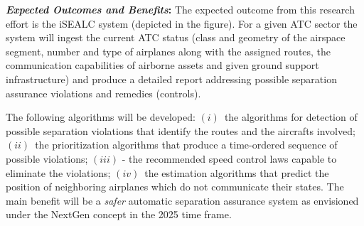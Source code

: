 \documentclass[letter,onecolumn,12pt]{aiaa-tc}
\newcommand{\1}{1_n}
\begin{document}

\medskip

\textbf{\emph{Expected Outcomes and Benefits}:} The expected outcome from this research effort is the iSEALC system (depicted in the figure). For a given ATC sector the system will ingest the current ATC status (class and geometry of the airspace segment, number and type of airplanes along with the assigned routes,  the communication capabilities of airborne assets and given ground support infrastructure) and produce a detailed report addressing possible separation assurance violations and remedies (controls).


The following algorithms will be developed: $(i)$~the algorithms for detection of possible separation violations that identify the routes and the aircrafts involved; $(ii)$~the prioritization algorithms that produce a time-ordered sequence of possible violations; $(iii)$ - the recommended speed control laws capable to eliminate the violations; $(iv)$~the estimation algorithms that predict the position of neighboring airplanes which do not communicate their states. The main benefit will be a \emph{safer} automatic separation assurance system as envisioned under the NextGen concept in the 2025 time frame.

\medskip
\end{document}
